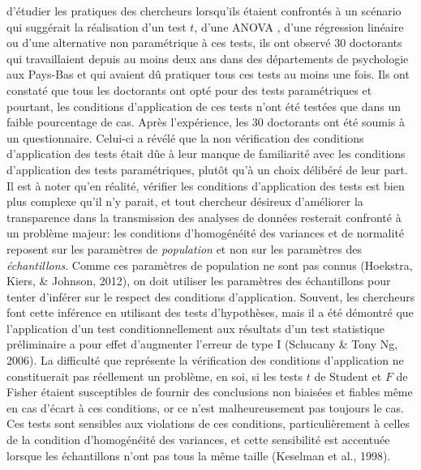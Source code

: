 \documentclass[
  12pt,
  french,
]{article}
\begin{document}
d'étudier les pratiques des chercheurs lorsqu'ils étaient confrontés à
un scénario qui suggérait la réalisation d'un test \(t\), d'une ANOVA ,
d'une régression linéaire ou d'une alternative non paramétrique à ces
tests, ils ont observé 30 doctorants qui travaillaient depuis au moins
deux ans dans des départements de psychologie aux Pays-Bas et qui
avaient dû pratiquer tous ces tests au moins une fois. Ils ont constaté
que tous les doctorants ont opté pour des tests paramétriques et
pourtant, les conditions d'application de ces tests n'ont été testées
que dans un faible pourcentage de cas. Après l'expérience, les 30
doctorants ont été soumis à un questionnaire. Celui-ci a révélé que la
non vérification des conditions d'application des tests était dûe à leur
manque de familiarité avec les conditions d'application des tests
paramétriques, plutôt qu'à un choix délibéré de leur part. Il est à
noter qu'en réalité, vérifier les conditions d'application des tests est
bien plus complexe qu'il n'y parait, et tout chercheur désireux
d'améliorer la transparence dans la transmission des analyses de données
resterait confronté à un problème majeur: les conditions d'homogénéité
des variances et de normalité reposent sur les paramètres de
\emph{population} et non sur les paramètres des \emph{échantillons}.
Comme ces paramètres de population ne sont pas connus (Hoekstra, Kiers,
\& Johnson, 2012), on doit utiliser les paramètres des échantillons pour
tenter d'inférer sur le respect des conditions d'application. Souvent,
les chercheurs font cette inférence en utilisant des tests d'hypothèses,
mais il a été démontré que l'application d'un test conditionnellement
aux résultats d'un test statistique préliminaire a pour effet
d'augmenter l'erreur de type I (Schucany \& Tony Ng, 2006). La
difficulté que représente la vérification des conditions d'application
ne constituerait pas réellement un problème, en soi, si les tests \(t\)
de Student et \(F\) de Fisher étaient susceptibles de fournir des
conclusions non biaisées et fiables même en cas d'écart à ces
conditions, or ce n'est malheureusement pas toujours le cas. Ces tests
sont sensibles aux violations de ces conditions, particulièrement à
celles de la condition d'homogénéité des variances, et cette sensibilité
est accentuée lorsque les échantillons n'ont pas tous la même taille
(Keselman et al., 1998).
\end{document}
